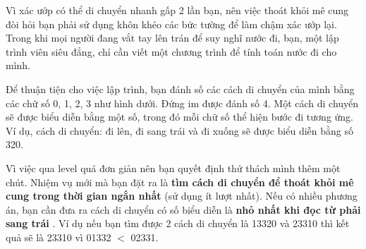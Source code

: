 Vì xác ướp có thể di chuyển nhanh gấp 2 lần bạn, nên việc thoát khỏi mê cung đòi hỏi bạn phải sử dụng khôn khéo các bức tường để làm chậm xác ướp lại. Trong khi mọi người đang vắt tay lên trán để suy nghĩ nước đi, bạn, một lập trình viên siêu đẳng, chỉ cần viết một chương trình để tính toán nước đi cho mình.

Để thuận tiện cho việc lập trình, bạn đánh số các cách di chuyển của mình bằng các chữ số 0, 1, 2, 3 như hình dưới. Đứng im được đánh số 4. Một cách di chuyển sẽ được biểu diễn bằng một số, trong đó mỗi chữ số thể hiện bước đi tương ứng. Ví dụ, cách di chuyển: đi lên, đi sang trái và đi xuống sẽ được biểu diễn bằng số 320.

Vì việc qua level quá đơn giản nên bạn quyết định thử thách mình thêm một chút. Nhiệm vụ mới mà bạn đặt ra là \textbf{ tìm cách di chuyển để thoát khỏi mê cung trong thời gian ngắn nhất } (sử dụng ít lượt nhất). Nếu có nhiều phương án, bạn cần đưa ra cách di chuyển có số biểu diễn là \textbf{ nhỏ nhất khi đọc từ phải sang trái } . Ví dụ nếu bạn tìm được 2 cách di chuyển là 13320 và 23310 thì kết quả sẽ là 23310 vì 01332 $<$ 02331.

 
